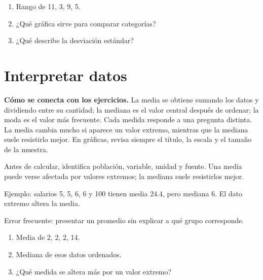 \documentclass[10pt,oneside,openany]{book}
\begin{document}
\begin{practica}

\begin{enumerate}

\item Rango de 11, 3, 9, 5.

\item ¿Qué gráfica sirve para comparar categorías?

\item ¿Qué describe la desviación estándar?

\end{enumerate}

\end{practica}



\section{Interpretar datos}

\textbf{Cómo se conecta con los ejercicios.} La media se obtiene sumando los datos y dividiendo entre su cantidad; la mediana es el valor central después de ordenar; la moda es el valor más frecuente. Cada medida responde a una pregunta distinta. La media cambia mucho si aparece un valor extremo, mientras que la mediana suele resistirlo mejor. En gráficas, revisa siempre el título, la escala y el tamaño de la muestra.

Antes de calcular, identifica población, variable, unidad y fuente. Una media puede verse afectada por valores extremos; la mediana suele resistirlos mejor.

\begin{ejemplo}
Ejemplo: salarios 5, 5, 6, 6 y 100 tienen media 24.4, pero mediana 6. El dato extremo altera la media.
\end{ejemplo}

\begin{ojo}
Error frecuente: presentar un promedio sin explicar a qué grupo corresponde.
\end{ojo}

\begin{practica}

\begin{enumerate}

\item Media de 2, 2, 2, 14.

\item Mediana de esos datos ordenados.

\item ¿Qué medida se altera más por un valor extremo?

\end{enumerate}

\end{practica}
\end{document}
